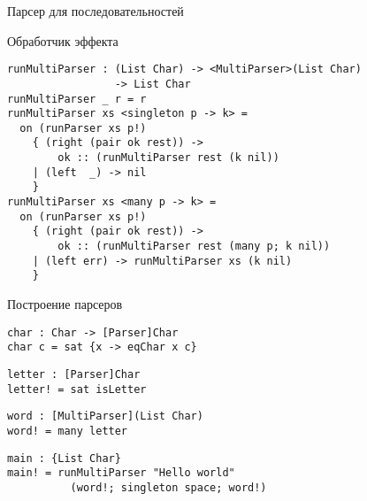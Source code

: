 \begin{frame}[fragile]{Парсер для последовательностей}
\begin{block}{Обработчик эффекта}
\begin{verbatim}
runMultiParser : (List Char) -> <MultiParser>(List Char)
                 -> List Char
runMultiParser _ r = r
runMultiParser xs <singleton p -> k> =
  on (runParser xs p!)
    { (right (pair ok rest)) ->
        ok :: (runMultiParser rest (k nil))
    | (left  _) -> nil
    }
runMultiParser xs <many p -> k> =
  on (runParser xs p!)
    { (right (pair ok rest)) ->
        ok :: (runMultiParser rest (many p; k nil))
    | (left err) -> runMultiParser xs (k nil)
    }
\end{verbatim}
\end{block}
\end{frame}

\begin{frame}[fragile]{Построение парсеров}
\begin{block}{}
\begin{verbatim}
char : Char -> [Parser]Char
char c = sat {x -> eqChar x c}
\end{verbatim}
\end{block}
\pause
\begin{block}{}
\begin{verbatim}
letter : [Parser]Char
letter! = sat isLetter
\end{verbatim}
\end{block}
\pause
\begin{block}{}
\begin{verbatim}
word : [MultiParser](List Char)
word! = many letter
\end{verbatim}
\end{block}
\pause
\begin{block}{}
\begin{verbatim}
main : {List Char}
main! = runMultiParser "Hello world"
          (word!; singleton space; word!)
\end{verbatim}
\end{block}
\end{frame}